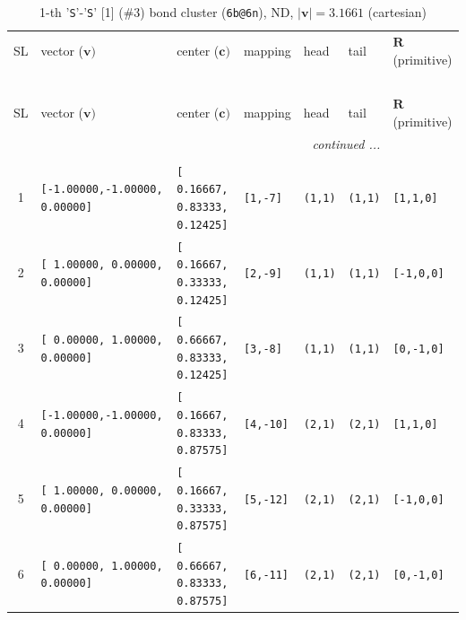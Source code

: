 \documentclass[fleqn,10pt,landscape]{jsarticle}
\begin{document}
\begin{longtable}[l]{cllllll}
\captionsetup{justification=raggedright, singlelinecheck=off}
\caption{1-th '\texttt{S}'-'\texttt{S}' [1] (\#3) bond cluster (\texttt{6b@6n}), ND, $|\bm{v}|=3.1661$ (cartesian)}
 \\
 \hline \hline
SL & vector ($\bm{v})$ & center ($\bm{c})$ & mapping & head & tail & $\bm{R}$ (primitive) \\ \hline \endfirsthead

\multicolumn{6}{l}{\tablename\ \thetable{}} \\
 \hline \hline
SL & vector ($\bm{v})$ & center ($\bm{c})$ & mapping & head & tail & $\bm{R}$ (primitive) \\ \hline \endhead

 \hline \hline
\multicolumn{6}{r}{\footnotesize\it continued ...} \\ \endfoot

 \hline \hline
\multicolumn{6}{r}{} \\ \endlastfoot

1 & \texttt{[-1.00000,-1.00000, 0.00000]} & \texttt{[ 0.16667, 0.83333, 0.12425]} & \texttt{[1,-7]} & \texttt{(1,1)} & \texttt{(1,1)} & \texttt{[1,1,0]} \\ \hline
2 & \texttt{[ 1.00000, 0.00000, 0.00000]} & \texttt{[ 0.16667, 0.33333, 0.12425]} & \texttt{[2,-9]} & \texttt{(1,1)} & \texttt{(1,1)} & \texttt{[-1,0,0]} \\ \hline
3 & \texttt{[ 0.00000, 1.00000, 0.00000]} & \texttt{[ 0.66667, 0.83333, 0.12425]} & \texttt{[3,-8]} & \texttt{(1,1)} & \texttt{(1,1)} & \texttt{[0,-1,0]} \\ \hline
4 & \texttt{[-1.00000,-1.00000, 0.00000]} & \texttt{[ 0.16667, 0.83333, 0.87575]} & \texttt{[4,-10]} & \texttt{(2,1)} & \texttt{(2,1)} & \texttt{[1,1,0]} \\ \hline
5 & \texttt{[ 1.00000, 0.00000, 0.00000]} & \texttt{[ 0.16667, 0.33333, 0.87575]} & \texttt{[5,-12]} & \texttt{(2,1)} & \texttt{(2,1)} & \texttt{[-1,0,0]} \\ \hline
6 & \texttt{[ 0.00000, 1.00000, 0.00000]} & \texttt{[ 0.66667, 0.83333, 0.87575]} & \texttt{[6,-11]} & \texttt{(2,1)} & \texttt{(2,1)} & \texttt{[0,-1,0]} \\
\end{longtable}
\end{document}
